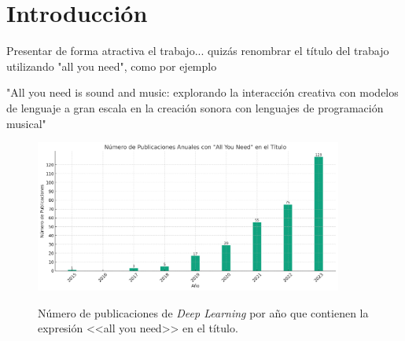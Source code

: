 \chapter{Introducción}

Presentar de forma atractiva el trabajo... quizás renombrar el título del trabajo utilizando "all you need", como por ejemplo 

"All you need is sound and music: explorando la interacción creativa con modelos de lenguaje a gran escala en la creación sonora con lenguajes de programación musical"


\begin{figure}[H]
    \caption[Número de publicaciones de \textit{Deep Learning} por año que contienen la expresión <<all you need>> en el título]{Número de publicaciones de \textit{Deep Learning} por año que contienen la expresión <<all you need>> en el título.}
    \centering
    \includegraphics[width=0.9\textwidth]{./figuras/all_you_need_publicacionies_anuales.png}
    \label{fig:all_you_need_publicaciones}
\end{figure}




